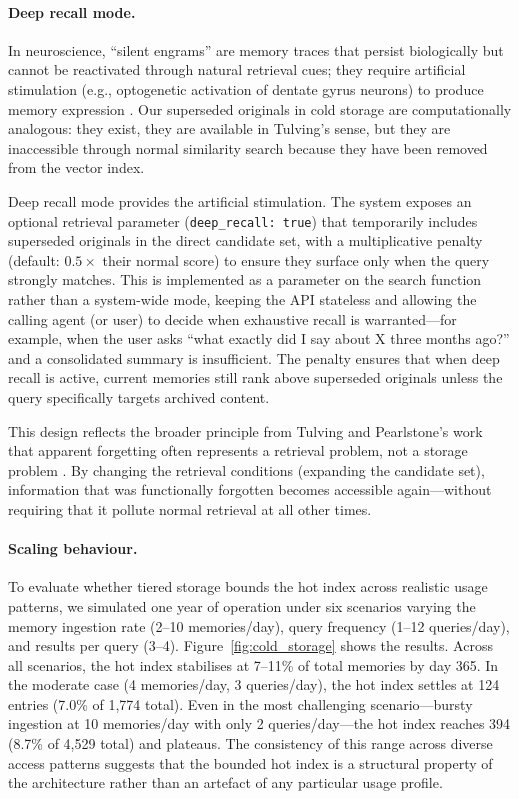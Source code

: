 \documentclass[11pt,a4paper]{article}
\begin{document}
\paragraph{Deep recall mode.} In neuroscience, ``silent engrams'' are memory traces that persist biologically but cannot be reactivated through natural retrieval cues; they require artificial stimulation (e.g., optogenetic activation of dentate gyrus neurons) to produce memory expression \citep{ryan2022forgetting, guskjolen2024forgetting}. Our superseded originals in cold storage are computationally analogous: they exist, they are available in Tulving's sense, but they are inaccessible through normal similarity search because they have been removed from the vector index.

Deep recall mode provides the artificial stimulation. The system exposes an optional retrieval parameter (\texttt{deep\_recall: true}) that temporarily includes superseded originals in the direct candidate set, with a multiplicative penalty (default: $0.5\times$ their normal score) to ensure they surface only when the query strongly matches. This is implemented as a parameter on the search function rather than a system-wide mode, keeping the API stateless and allowing the calling agent (or user) to decide when exhaustive recall is warranted---for example, when the user asks ``what exactly did I say about X three months ago?'' and a consolidated summary is insufficient. The penalty ensures that when deep recall is active, current memories still rank above superseded originals unless the query specifically targets archived content.

This design reflects the broader principle from Tulving and Pearlstone's work that apparent forgetting often represents a retrieval problem, not a storage problem \citep{tulving1966availability}. By changing the retrieval conditions (expanding the candidate set), information that was functionally forgotten becomes accessible again---without requiring that it pollute normal retrieval at all other times.

\paragraph{Scaling behaviour.} To evaluate whether tiered storage bounds the hot index across realistic usage patterns, we simulated one year of operation under six scenarios varying the memory ingestion rate (2--10 memories/day), query frequency (1--12 queries/day), and results per query (3--4). Figure~\ref{fig:cold_storage} shows the results. Across all scenarios, the hot index stabilises at 7--11\% of total memories by day 365. In the moderate case (4 memories/day, 3 queries/day), the hot index settles at 124 entries (7.0\% of 1,774 total). Even in the most challenging scenario---bursty ingestion at 10 memories/day with only 2 queries/day---the hot index reaches 394 (8.7\% of 4,529 total) and plateaus. The consistency of this range across diverse access patterns suggests that the bounded hot index is a structural property of the architecture rather than an artefact of any particular usage profile.
\end{document}
